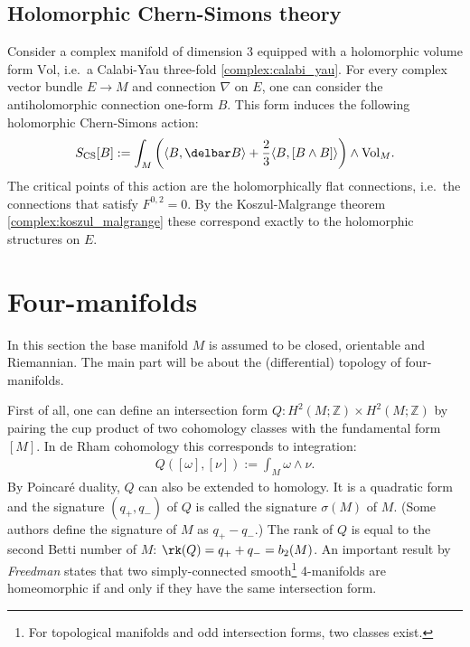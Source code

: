 \subsection{Holomorphic Chern-Simons theory}

    Consider a complex manifold of dimension 3 equipped with a holomorphic volume form $\mathrm{Vol}$, i.e.~a Calabi-Yau three-fold \ref{complex:calabi_yau}. For every complex vector bundle $E\rightarrow M$ and connection $\nabla$ on $E$, one can consider the antiholomorphic connection one-form $B$. This form induces the following holomorphic Chern-Simons action:
    \begin{gather}
        S_\mathrm{CS}[B]:=\int_M\left(\langle B,\delbar B \rangle+\frac{2}{3}
        \langle B,[B\wedge B] \rangle\right)\wedge\mathrm{Vol}_M.
    \end{gather}
    The critical points of this action are the holomorphically flat connections, i.e.~the connections that satisfy $F^{0,2}=0$. By the Koszul-Malgrange theorem \ref{complex:koszul_malgrange} these correspond exactly to the holomorphic structures on $E$.

\section{Four-manifolds}

    In this section the base manifold $M$ is assumed to be closed, orientable and Riemannian. The main part will be about the (differential) topology of four-manifolds.

    First of all, one can define an intersection form $Q:H^2(M;\mathbb{Z})\times H^2(M;\mathbb{Z})$ by pairing the cup product of two cohomology classes with the fundamental form $[M]$. In de Rham cohomology this corresponds to integration:
    \begin{gather}
        Q([\omega],[\nu]) := \int_M\omega\wedge\nu.
    \end{gather}
    By Poincar\'e duality, $Q$ can also be extended to homology. It is a quadratic form and the signature $(q_+,q_-)$ of $Q$ is called the signature $\sigma(M)$ of $M$. (Some authors define the signature of $M$ as $q_+-q_-$.) The rank of $Q$ is equal to the second Betti number of $M$: $\rk(Q)=q_++q_-=b_2(M)$. An important result by \textit{Freedman} states that two simply-connected smooth\footnote{For topological manifolds and odd intersection forms, two classes exist.} 4-manifolds are homeomorphic if and only if they have the same intersection form.

